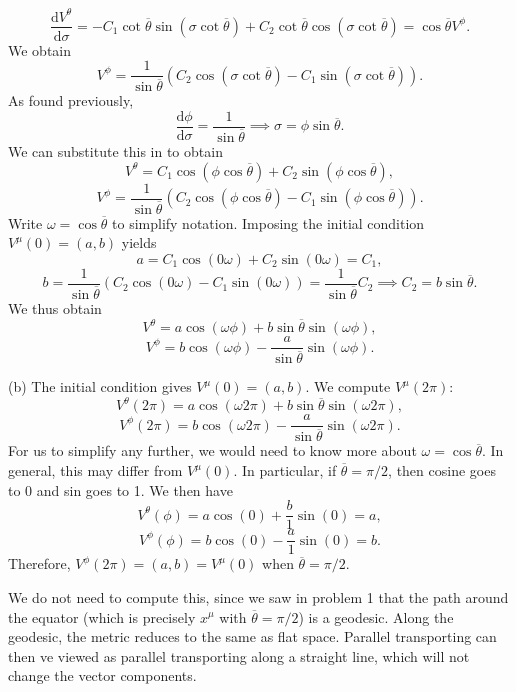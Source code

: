 \documentclass[11pt, letterpaper]{article}
\theoremstyle{plain}
\begin{document}
\[
	\frac{\mathrm{d}V^\theta }{\mathrm{d}\sigma } =-C_1 \cot \overline{\theta } \sin \left( \sigma \cot \overline{\theta }  \right) + C_2 \cot \overline{\theta }\cos \left( \sigma \cot \overline{\theta }  \right) = \cos \overline{\theta } V^\phi 
.\]
We obtain
\[
	V^\phi = \frac{1}{\sin \overline{\theta }} \left( C_2 \cos \left( \sigma \cot \overline{\theta }  \right) -C_1 \sin \left( \sigma \cot \overline{\theta }  \right)  \right) 
.\]
As found previously,
\[
	\frac{\mathrm{d}\phi }{\mathrm{d}\sigma } =\frac{1}{\sin \overline{\theta } } \implies \sigma =\phi \sin \overline{\theta } 
.\]
We can substitute this in to obtain
\[
	V^\theta =C_1 \cos \left( \phi \cos \overline{\theta }  \right) +C_2 \sin \left( \phi \cos \overline{\theta }  \right) ,
\]
\[
	V^\phi =\frac{1}{\sin \overline{\theta } } \left( C_2 \cos \left( \phi \cos \overline{\theta }  \right) -C_1 \sin \left( \phi \cos \overline{\theta }  \right)  \right) 
.\]
Write $\omega = \cos \overline{\theta } $ to simplify notation. Imposing the initial condition $V^\mu (0)=(a,b)$ yields
\[
	a= C_1 \cos (0\omega )+C_2 \sin (0\omega )=C_1,
\]
\[
	b= \frac{1}{\sin \overline{\theta } } \left( C_2 \cos (0\omega )-C_1 \sin (0\omega ) \right) = \frac{1}{\sin \overline{\theta } } C_2 \implies C_2 = b \sin \overline{\theta } 
.\]
We thus obtain
\[
	V^\theta =a \cos (\omega \phi )+ b \sin \overline{\theta } \sin (\omega \phi ),
\]
\[
	V^\phi =b \cos (\omega \phi )- \frac{a}{\sin \overline{\theta } } \sin (\omega \phi )
.\]

(b) The initial condition gives $V^\mu (0)=(a,b)$. We compute $V^\mu (2\pi )$:
\[
	V^\theta (2\pi )=a \cos (\omega 2\pi )+ b \sin \overline{\theta }  \sin (\omega 2\pi ),
\]
\[
	V^\phi (2\pi )=b \cos (\omega 2\pi )-\frac{a }{\sin \overline{\theta }} \sin (\omega 2\pi )
.\]
For us to simplify any further, we would need to know more about $\omega =\cos \overline{\theta } $. In general, this may differ from $V^\mu (0)$. In particular, if $\overline{\theta } =\pi /2$, then cosine goes to 0 and sin goes to 1. We then have
\[
	V^\theta (\phi )=a \cos (0)+\frac{b}{1} \sin (0)=a,
\]
\[
	V^\phi (\phi )=b \cos (0)-\frac{a}{1} \sin (0)=b
.\]
Therefore, $V^\phi (2\pi )=(a,b)=V^\mu (0)$ when $\overline{\theta } =\pi /2$.

We do not need to compute this, since we saw in problem 1 that the path around the equator (which is precisely $x^\mu$ with $\overline{\theta } =\pi /2$) is a geodesic. Along the geodesic, the metric reduces to the same as flat space. Parallel transporting can then ve viewed as parallel transporting along a straight line, which will not change the vector components.
\end{document}
